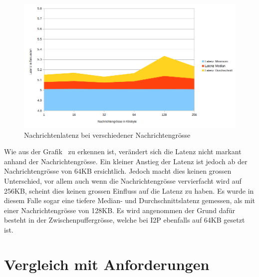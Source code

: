 \begin{figure}[htp]
  \includegraphics[width=1.1\textwidth]{img/auswertung-nachrichtengroesse.png}
  \caption{Nachrichtenlatenz bei verschiedener Nachrichtengrösse}\label{fig:auswertung-nachrichtengroesse}
\end{figure}

Wie aus der Grafik~ zu erkennen ist, verändert sich die Latenz nicht markant anhand der Nachrichtengrösse.
Ein kleiner Anstieg der Latenz ist jedoch ab der Nachrichtengrösse von 64KB ersichtlich.
Jedoch macht dies keinen grossen Unterschied, vor allem auch wenn die Nachrichtengrösse vervierfacht wird auf 256KB, scheint dies keinen grossen Einfluss auf die Latenz zu haben.
Es wurde in diesem Falle sogar eine tiefere Median- und Durchschnittslatenz gemessen, als mit einer Nachrichtengrösse von 128KB.
Es wird angenommen der Grund dafür besteht in der Zwischenpuffergrösse, welche bei I2P ebenfalls auf 64KB gesetzt ist.

\section{Vergleich mit Anforderungen}\label{sec:vergleich_anforderungen}

